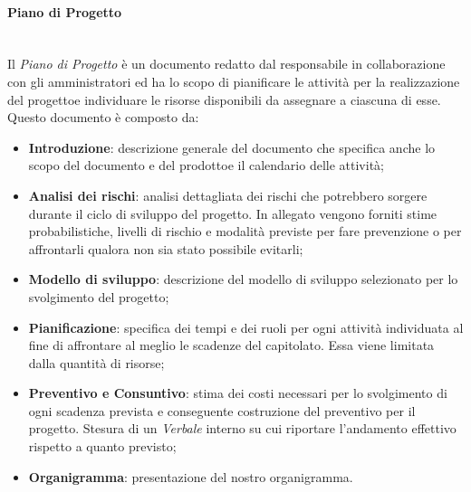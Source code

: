 \paragraph{Piano di Progetto}\mbox{}\\ [1mm]
Il \textit{Piano di Progetto} è un documento redatto dal responsabile in collaborazione con gli amministratori ed ha lo scopo di pianificare le attività per la realizzazione del progetto\glosp e individuare le risorse disponibili da assegnare a ciascuna di esse.
Questo documento è composto da:
\begin{itemize}
	\item \textbf{Introduzione}: descrizione generale del documento che specifica anche lo scopo del documento e del prodotto\glosp e il calendario delle attività;
	\item \textbf{Analisi dei rischi}: analisi dettagliata dei rischi che potrebbero sorgere durante il ciclo di sviluppo del progetto\glo. In allegato vengono forniti stime probabilistiche, livelli di rischio e modalità previste per fare prevenzione o per affrontarli qualora non sia stato possibile evitarli;
	\item \textbf{Modello di sviluppo}: descrizione del modello di sviluppo selezionato per lo svolgimento del progetto\glo;
	\item \textbf{Pianificazione}: specifica dei tempi e dei ruoli per ogni attività individuata al fine di affrontare al meglio le scadenze del capitolato\glo. Essa viene limitata dalla quantità di risorse;
	\item \textbf{Preventivo e Consuntivo}: stima dei costi necessari per lo svolgimento di ogni scadenza prevista e conseguente costruzione del preventivo per il progetto\glo. Stesura di un \textit{Verbale} interno su cui riportare l'andamento effettivo rispetto a quanto previsto;
	\item \textbf{Organigramma}: presentazione del nostro organigramma.
\end{itemize}
